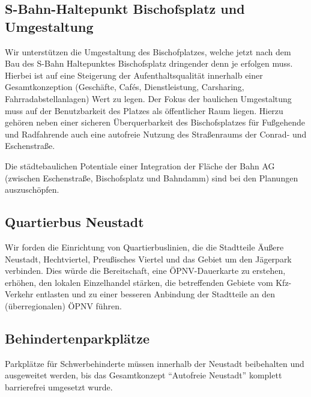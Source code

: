 \documentclass[a4paper, 11pt]{article}
\begin{document}
\subsection{S-Bahn-Haltepunkt Bischofsplatz und Umgestaltung}
Wir unterstützen die Umgestaltung des Bischofplatzes, welche jetzt nach dem Bau des S-Bahn Haltepunktes Bischofsplatz dringender denn je erfolgen muss. Hierbei ist auf eine Steigerung der Aufenthaltsqualität innerhalb einer Gesamtkonzeption (Geschäfte, Cafés, Dienstleistung, Carsharing, Fahrradabstellanlagen) Wert zu legen. Der Fokus der baulichen Umgestaltung muss auf der Benutzbarkeit des Platzes als öffentlicher Raum liegen. Hierzu gehören neben einer sicheren Überquerbarkeit des Bischofsplatzes für Fußgehende und Radfahrende auch eine autofreie Nutzung des Straßenraums der Conrad- und Eschenstraße.\newline

Die städtebaulichen Potentiale einer Integration der Fläche der Bahn AG (zwischen Eschenstraße, Bischofsplatz und Bahndamm) sind bei den Planungen auszuschöpfen.




\subsection{Quartierbus Neustadt}
Wir forden die Einrichtung von Quartierbuslinien, die die Stadtteile Äußere Neustadt, Hechtviertel, Preußisches Viertel und das Gebiet um den Jägerpark verbinden. Dies würde die Bereitschaft, eine ÖPNV-Dauerkarte zu erstehen, erhöhen, den lokalen Einzelhandel stärken, die betreffenden Gebiete vom Kfz-Verkehr entlasten und zu einer besseren Anbindung der Stadtteile an den (überregionalen) ÖPNV führen.


\subsection{Behindertenparkplätze}
Parkplätze für Schwerbehinderte müssen innerhalb der Neustadt beibehalten und ausgeweitet werden, bis das Gesamtkonzept ``Autofreie Neustadt'' komplett barrierefrei umgesetzt wurde.
\end{document}
